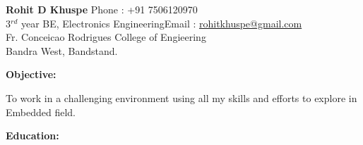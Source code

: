 \documentclass[a4paper]{res}
\begin{document}
	\begin{flushleft}
		\large\textbf{Rohit D Khuspe} \hfill{Phone : +91 7506120970}\\
		3$^{rd}$ year BE, Electronics Engineering\hfill{Email : \underline{rohitkhuspe@gmail.com}}\\
		Fr. Conceicao Rodrigues College of Engieering\\
		Bandra West, Bandstand.\\
		
			
	\end{flushleft}
	\hline
	
 \begin{flushleft}
 	\begin{Large}\textbf{Objective:}\end{Large} \hspace{0.05in}To work in a challenging environment using all my skills and efforts to explore in\\\hspace{1.075in} Embedded field.\\
 	\begin{Large}\vspace{0.5in}\textbf{Education:}\end{Large}
 	
 \end{flushleft}

	

	
\end{document}
